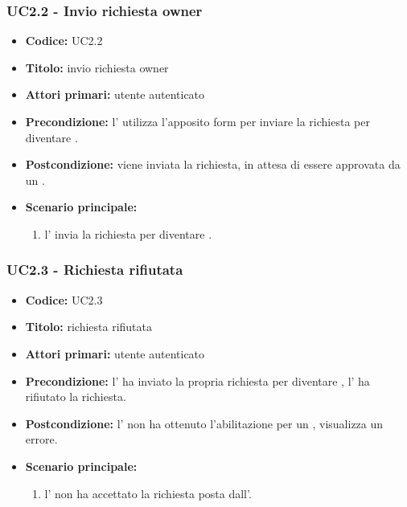 \documentclass[casi-duso]{subfiles}
\begin{document}
\subsubsection{UC2.2 - Invio richiesta owner}
\label{subsub:UC2.2}
\begin{itemize}
  \item \textbf{Codice:} UC2.2
  \item \textbf{Titolo:} invio richiesta owner
  \item \textbf{Attori primari:} utente autenticato
  \item \textbf{Precondizione:} l' utilizza l'apposito form per inviare la richiesta per diventare .
  \item \textbf{Postcondizione:} viene inviata la richiesta, in attesa di essere approvata da un .
  \item \textbf{Scenario principale:} 
  \begin{enumerate}
    \item l' invia la richiesta per diventare .
  \end{enumerate}
\end{itemize}

\subsubsection{UC2.3 - Richiesta rifiutata}
\label{subsub:UC2.3}
\begin{itemize}
  \item \textbf{Codice:} UC2.3
  \item \textbf{Titolo:} richiesta rifiutata
  \item \textbf{Attori primari:} utente autenticato
  \item \textbf{Precondizione:} l' ha inviato la propria richiesta per diventare , l' ha rifiutato la richiesta.
  \item \textbf{Postcondizione:} l' non ha ottenuto l'abilitazione per un , visualizza un errore.
  \item \textbf{Scenario principale:} 
  \begin{enumerate}
    \item l' non ha accettato la richiesta posta dall'.
  \end{enumerate}
\end{itemize}
\end{document}
